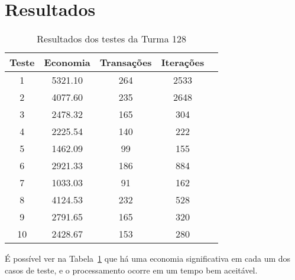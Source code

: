 \documentclass[12pt]{article}
\begin{document}
\section{Resultados}\label{sec:resultados}

\begin{table}[H]
  \centering
\begin{tabular}{||c|c||c|c|c||}
  \hline
Teste & Economia & Transações & Iterações \\ [0.5ex]
  \hline\hline
  1 & 5321.10 & 264 & 2533 \\
  \hline
  2 & 4077.60 & 235 & 2648 \\
  \hline
  3 & 2478.32 & 165 & 304 \\
  \hline
  4 & 2225.54 & 140 & 222 \\
  \hline
  5 & 1462.09  & 99 & 155 \\
  \hline
  6 & 2921.33 & 186 & 884 \\
  \hline
  7 & 1033.03  & 91 & 162 \\
  \hline
  8 & 4124.53 & 232 & 528 \\
  \hline
  9 & 2791.65 & 165 & 320 \\
  \hline
  10 & 2428.67 & 153 & 280 \\
\hline
\end{tabular}

\caption{Resultados dos testes da Turma 128}
\label{tab:resultados}
\end{table}


É possível ver na Tabela~\ref{tab:resultados} que há uma economia significativa
em cada um dos casos de teste, e o processamento ocorre em um tempo bem aceitável.
\end{document}
